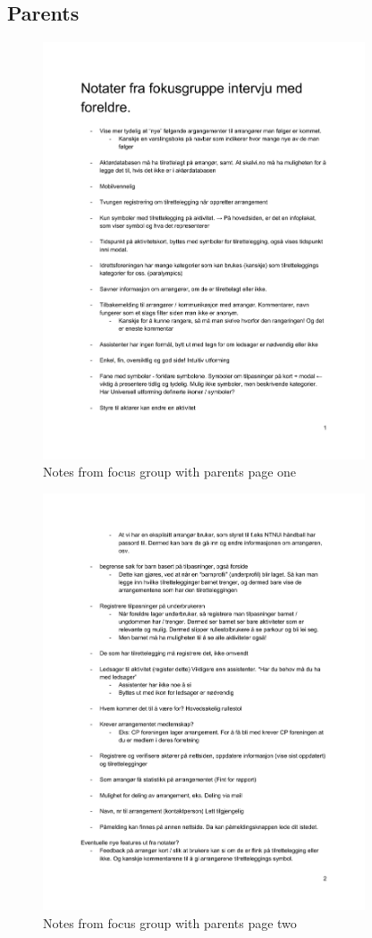\subsection{Parents}
\begin{figure}[H]
\centering
    \includegraphics[width=0.85\textwidth]{fig/focusgroup/FGParents_1.pdf}
    \caption{Notes from focus group with parents page one}
    \label{Parents_1}
\end{figure}

\begin{figure}[H]
\centering
    \includegraphics[width=0.85\textwidth]{fig/focusgroup/FGParents_2.pdf}
    \caption{Notes from focus group with parents page two}
    \label{Parents_2}
\end{figure}

\cleardoublepage